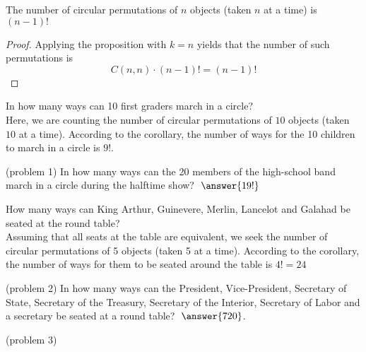 \documentclass[handout]{ximera}
\begin{document}
\begin{corollary}
The number of circular permutations of $n$ objects (taken $n$ at a time) is $(n-1)!$
\end{corollary}
\begin{proof}
Applying the proposition with $k = n$ yields that the number of such permutations is
\[
C(n,n)\cdot (n-1)! = (n-1)!
\]
\end{proof}

\begin{example}[example 1]
In how many ways can 10 first graders march in a circle?\\
Here, we are counting the number of circular permutations of $10$ objects (taken $10$ at a time).
According to the corollary, the number of ways for the 10 children to march in a circle is $9!$.
\end{example}


\begin{problem}(problem 1)
In how many ways can the 20 members of the high-school band march in a circle during the halftime show? $\; \answer{19!}$
\end{problem}


\begin{example}[example 2]
How many ways can King Arthur, Guinevere, Merlin, Lancelot and Galahad be seated at the round table?\\
Assuming that all seats at the table are equivalent, we seek the number of circular 
permutations of 5 objects (taken 5 at a time).  According to the corollary, the number of ways for 
them to be seated around the table is $4! =24$
\end{example}


\begin{problem}(problem 2)
In how many ways can the President, Vice-President, Secretary of State, Secretary of the Treasury, 
Secretary of the Interior, Secretary of Labor and a secretary be seated at a round table? $\; \answer{720}$.

\end{problem}


\begin{example}[example 3]

\end{example}


\begin{problem}(problem 3)


\end{problem}


\begin{example}[example 4]

\end{example}
\end{document}
